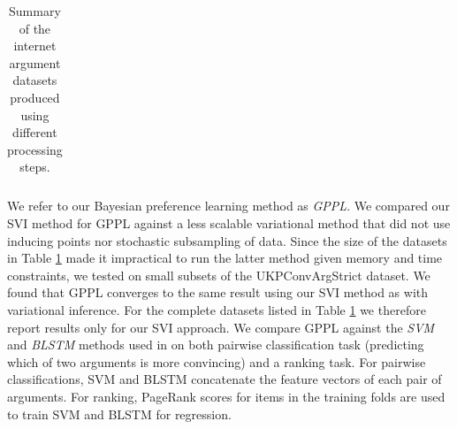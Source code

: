 \begin{table}
\begin{tabularx}{\textwidth}{ p{3cm} | p{1cm} p{1cm} p{1cm} X }
  \end{tabularx}
  \caption{\label{tab:expt_data} Summary of the internet argument datasets produced using different processing steps.}
\end{table}

We refer to our Bayesian preference learning method as \emph{GPPL}.
We compared our SVI method for GPPL against a less scalable variational method 
that did not use inducing points nor stochastic subsampling of data. 
Since the size of the datasets in Table \ref{tab:expt_data} made it impractical to run the latter method
given memory and time constraints, we tested on small subsets of the UKPConvArgStrict dataset.
We found that GPPL converges to the same result using our SVI method 
as with variational inference. For the complete datasets listed in Table \ref{tab:expt_data} 
we therefore report results only for our SVI approach.
We compare GPPL against the \emph{SVM} and \emph{BLSTM} methods used in \cite{habernal2016argument}
on both pairwise classification task (predicting which of two arguments is more convincing) and
a ranking task.
For pairwise classifications, SVM and BLSTM concatenate the feature vectors of each pair of arguments. 
For ranking, PageRank scores for items in the training folds are used to train SVM and BLSTM for regression.

